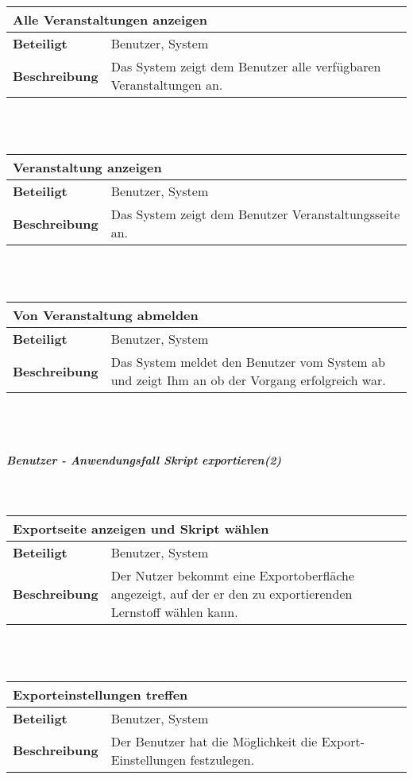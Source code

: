 \documentclass[12pt,a4paper]{article}
\begin{document}
\begin{tabular}{l p{10cm}}
\multicolumn{2}{l}{\textbf{Alle Veranstaltungen anzeigen}} \\ \hline
\textbf{Beteiligt} & Benutzer, System \\ \hline 
\textbf{Beschreibung} & Das System zeigt dem Benutzer alle verfügbaren Veranstaltungen an.\\ 
\hline 
\end{tabular}\\\\

\begin{tabular}{l p{10cm}}
\multicolumn{2}{l}{\textbf{Veranstaltung anzeigen}} \\ \hline
\textbf{Beteiligt} & Benutzer, System \\ \hline 
\textbf{Beschreibung} & Das System zeigt dem Benutzer  Veranstaltungsseite an.\\ 
\hline 
\end{tabular}\\\\

\begin{tabular}{l p{10cm}}
\multicolumn{2}{l}{\textbf{Von Veranstaltung abmelden}} \\ \hline
\textbf{Beteiligt} & Benutzer, System \\ \hline 
\textbf{Beschreibung} & Das System meldet den Benutzer vom System ab und zeigt Ihm an ob der Vorgang erfolgreich war.\\ 
\hline 
\end{tabular}\\\\
\subparagraph{Benutzer - Anwendungsfall \glqq Skript exportieren\grqq (2)}\mbox{}\\

\begin{tabular}{l p{10cm}}
\multicolumn{2}{l}{\textbf{Exportseite anzeigen und Skript wählen}} \\ \hline
\textbf{Beteiligt} & Benutzer, System \\ \hline 
\textbf{Beschreibung} & Der Nutzer bekommt eine Exportoberfläche angezeigt, auf der er den zu exportierenden Lernstoff wählen kann.\\ 
\hline 
\end{tabular}\\\\

\begin{tabular}{l p{10cm}}
\multicolumn{2}{l}{\textbf{Exporteinstellungen treffen}} \\ \hline
\textbf{Beteiligt} & Benutzer, System \\ \hline 
\textbf{Beschreibung} & Der Benutzer hat die Möglichkeit die Export-Einstellungen festzulegen.\\ 
\hline 
\end{tabular}\\\\
\end{document}
